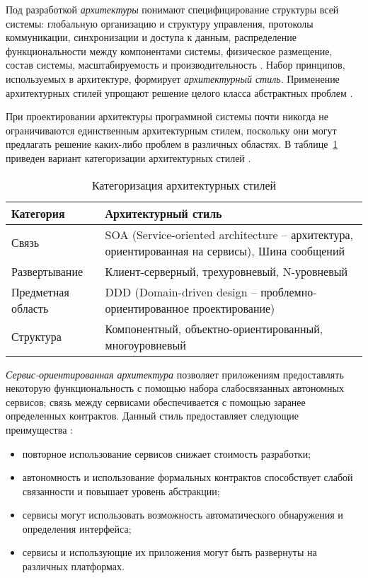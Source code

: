 Под разработкой \emph{архитектуры} понимают специфицирование структуры всей системы: глобальную организацию и структуру управления, протоколы коммуникации, синхронизации и доступа к данным, распределение функциональности между компонентами системы, физическое размещение, состав системы, масштабируемость и производительность \cite{introduction_to_architecture}. Набор принципов, используемых в архитектуре, формирует \emph{архитектурный стиль}. Применение архитектурных стилей упрощают решение целого класса абстрактных проблем \cite{architecture_volosevich}.

При проектировании архитектуры программной системы почти никогда не ограничиваются единственным архитектурным стилем, поскольку они могут предлагать решение каких-либо проблем в различных областях. В таблице~\ref{table:analysis:architectures:categorization} приведен вариант категоризации архитектурных стилей \cite{application_architecture_guide}.

\begin{table}[ht]
\caption{Категоризация архитектурных стилей}
\label{table:analysis:architectures:categorization}
\centering
  \begin{tabular}{|>{\raggedright}m{} 
                  |>{\raggedright\arraybackslash}m{}|}
  \hline Категория & Архитектурный стиль \\
  \hline Связь & SOA (Service-oriented architecture -- архитектура, ориентированная на сервисы), Шина сообщений \\
  \hline Развертывание & Клиент-серверный, трехуровневый, N-уровневый \\
  \hline Предметная область & DDD (Domain-driven design -- проблемно-ориентированное проектирование) \\
  \hline Структура & Компонентный, объектно-ориентированный, многоуровневый\\
  \hline
  \end{tabular}
\end{table}

\emph{Сервис-ориентированная архитектура} позволяет приложениям предоставлять некоторую функциональность с помощью набора слабосвязанных автономных сервисов; связь между сервисами обеспечивается с помощью заранее определенных контрактов. Данный стиль предоставляет следующие преимущества \cite{application_architecture_guide}:

\begin{itemize}
	\item повторное использование сервисов снижает стоимость разработки;
	\item автономность и использование формальных контрактов способствует слабой связанности и повышает уровень абстракции;
	\item сервисы могут использовать возможность автоматического обнаружения и определения интерфейса;
	\item сервисы и использующие их приложения могут быть развернуты на различных платформах.
\end{itemize}

